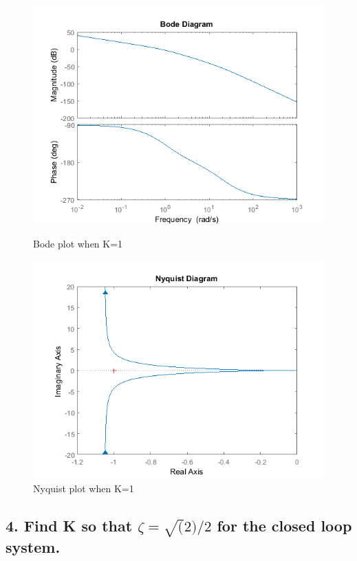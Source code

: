{\begin{figure}
	\centering
	\begin{minipage}{0.475\textwidth}
		\centering
		\includegraphics [width=1\linewidth]{ELEC460A1_02.png} %
		\caption{Bode plot when K=1}
	\end{minipage}\hfill
	\begin{minipage}{0.475\textwidth}
		\centering
		\includegraphics [width=1\linewidth]{ELEC460A1_03.png} %
		\caption{Nyquist plot when K=1}
	\end{minipage}
\end{figure}

\subsection*{4. Find K so that $\zeta=\sqrt(2)/2$ for the closed loop system.}

}
